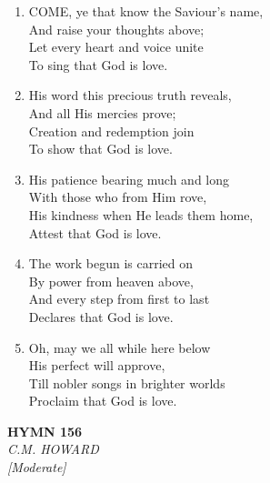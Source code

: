 \begin{enumerate}
    \item COME, ye that know the Saviour's name, \\
        And raise your thoughts above; \\
        Let every heart and voice unite \\
        To sing that God is love.

    \item His word this precious truth reveals, \\
        And all His mercies prove; \\
        Creation and redemption join \\
        To show that God is love.

    \item His patience bearing much and long \\
        With those who from Him rove, \\
        His kindness when He leads them home, \\
        Attest that God is love.

    \item The work begun is carried on \\
        By power from heaven above, \\
        And every step from first to last \\
        Declares that God is love.

    \item Oh, may we all while here below \\
        His perfect will approve, \\
        Till nobler songs in brighter worlds \\
        Proclaim that God is love.

\end{enumerate}

\newpage
\begin{center}
    {\Large \textbf{HYMN 156}}
    \\
    \textit{C.M. HOWARD}
    \\
    \textit{\small [Moderate]}
\end{center}
\vspace{1em}

